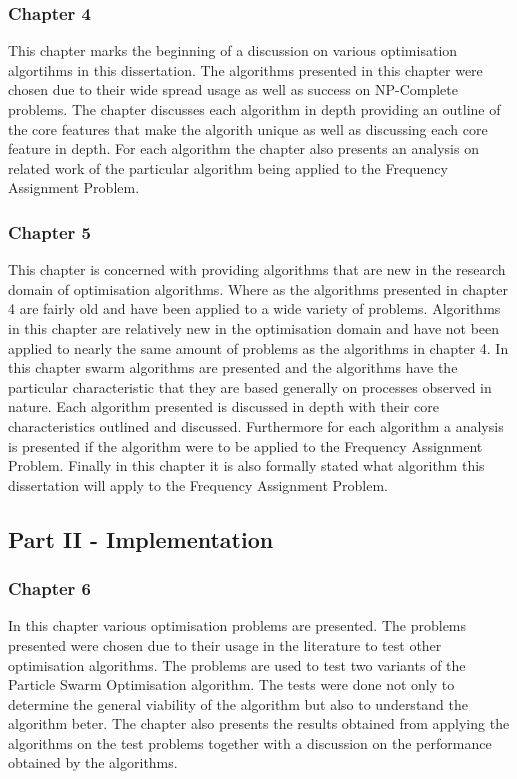 \subsubsection{Chapter 4}
This chapter marks the beginning of a discussion on various optimisation algortihms in this dissertation. The algorithms presented in this chapter were chosen due to their wide spread usage as well as success on NP-Complete problems. The chapter discusses each algorithm in depth providing an outline of the core features that make the algorith unique as well as discussing each core feature in depth. For each algorithm the chapter also presents an analysis on related work of the particular algorithm being applied to the Frequency Assignment Problem. 
\subsubsection{Chapter 5}
This chapter is concerned with providing algorithms that are new in the research domain of optimisation algorithms. Where as the algorithms presented in chapter 4 are fairly old and have been applied to a wide variety of problems. Algorithms in this chapter are relatively new in the optimisation domain and have not been applied to nearly the same amount of problems as the algorithms in chapter 4. In this chapter swarm algorithms are presented and the algorithms have the particular characteristic that they are based generally on processes observed in nature. Each algorithm presented is discussed in depth with their core characteristics outlined and discussed. Furthermore for each algorithm a analysis is presented if the algorithm were to be applied to the Frequency Assignment Problem. Finally in this chapter it is also formally stated what algorithm this dissertation will apply to the Frequency Assignment Problem.
\subsection{Part II - Implementation}
\subsubsection{Chapter 6}
In this chapter various optimisation problems are presented. The problems presented were chosen due to their usage in the literature to test other optimisation algorithms. The problems are used to test two variants of the Particle Swarm Optimisation algorithm. The tests were done not only to determine the general viability of the algorithm but also to understand the algorithm beter. The chapter also presents the results obtained from applying the algorithms on the test problems together with a discussion on the performance obtained by the algorithms.
